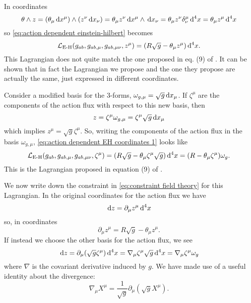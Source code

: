 \documentclass[../main.tex]{subfiles}
\begin{document}
In coordinates 
\begin{equation*}
	\theta \wedge z = (\theta_\mu \,\mathrm{d} x^\mu) \wedge (z^\nu \,\mathrm{d} x_\nu) = \theta_\mu z^\nu \,\mathrm{d}
	x^\mu \wedge \,\mathrm{d} x_\nu = \theta_\mu z^\nu \delta^\mu_\nu \,\mathrm{d}^4 x = \theta_\mu z^\mu
	\,\mathrm{d}^4x
\end{equation*}
so \cref{eq:action dependent einstein-hilbert} becomes 
\begin{equation}\label{eq:action dependent EH coordinates 1}
	\mathcal{L}_{\text{E-H}}(g_{ab}, g_{ab,\mu}, g_{ab,\mu\nu}, z^\mu) = (R\sqrt{g} - \theta_\mu
	z^\mu) \,\mathrm{d}^4 x. 
\end{equation}
This Lagrangian does not quite match the one proposed in eq. (9) of \cite{Lazo2017}. It
can be shown that in fact the Lagrangian we propose and the one they propose are actually
the same, just expressed in different coordinates. 

Consider a modified basis for the 3-forms, \( \omega_{g,\mu} = \sqrt{g}
\,\mathrm{d} x_\mu \). If \( \zeta^\mu \) are the components of the action flux with respect to
this new basis, then
\begin{equation*}
	z = \zeta^\mu \omega_{g,\mu} = \zeta^\mu \sqrt{g} \,\mathrm{d} x_\mu
\end{equation*}
which implies \( z^\mu = \sqrt{g} \zeta^\mu \). So, writing the components of the action
flux in the basis \( \omega_{g,\mu} \), \cref{eq:action dependent EH coordinates 1} looks like
\begin{equation}\label{eq:action dependent EH coordinates 2}
	\mathcal{L}_{\text{E-H}}(g_{ab}, g_{ab,\mu}, g_{ab,\mu\nu}, \zeta^\mu) = (R\sqrt{g} - \theta_\mu
	\zeta^\mu \sqrt{g}) \,\mathrm{d}^4 x = (R - \theta_\mu \zeta^\mu)\omega_g.
\end{equation}
This is the Lagrangian proposed in equation (9) of \cite{Lazo2017}. 

We now write down the constraint in \cref{eq:constraint field theory} for this Lagrangian.
In the original coordinates for the action flux we have
\begin{equation*}
	\,\mathrm{d} z = \partial_\mu z^\mu \,\mathrm{d}^4 x
\end{equation*}
so, in coordinates
\begin{equation} \label{eq:constraint coordinates 1}
	\partial_\mu z^\mu = R\sqrt{g} - \theta_\mu z^\mu. 
\end{equation}
If instead we choose the other basis for the action flux, we see
\begin{equation*}
	\,\mathrm{d} z = \partial_\mu (\sqrt{g} \zeta^\mu) \,\mathrm{d}^4 x = \nabla_\mu \zeta^\mu \sqrt{g}\,\mathrm{d}^4x
	= \nabla_\mu \zeta^\mu \omega_g
\end{equation*}
where \( \nabla \) is the covariant derivative induced by \( g \). We have made use of a
useful identity about the divergence:
\begin{equation} \label{eq:divergence identity}
	\nabla_\mu X^\mu = \frac{1}{\sqrt{g}} \partial_\mu (\sqrt{g}X^\mu).
\end{equation}
\end{document}

